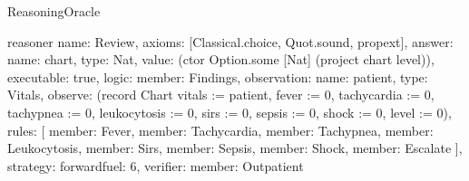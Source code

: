 \begin{lexlean}{ReasoningOracle}
\begin{semanticmodule}
reasoner{
  name: Review,
  axioms: [Classical.choice, Quot.sound, propext],
  answer: {name: chart, type: Nat, value: (ctor Option.some [Nat] (project chart level))},
  executable: true,
  logic: {member: Findings},
  observation: {name: patient, type: Vitals},
  observe: (record Chart {vitals := patient, fever := 0, tachycardia := 0, tachypnea := 0, leukocytosis := 0, sirs := 0, sepsis := 0, shock := 0, level := 0}),
  rules: [
    {member: Fever},
    {member: Tachycardia},
    {member: Tachypnea},
    {member: Leukocytosis},
    {member: Sirs},
    {member: Sepsis},
    {member: Shock},
    {member: Escalate}
  ],
  strategy: forward{fuel: 6},
  verifier: {member: Outpatient}
}
\end{semanticmodule}
\end{lexlean}
